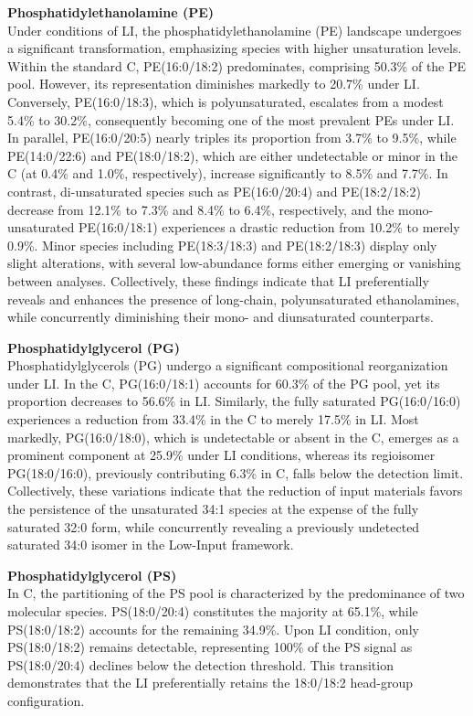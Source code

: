 \documentclass[10pt,letterpaper]{article}
\begin{document}
\textbf{Phosphatidylethanolamine (PE)}  \\
Under conditions of LI, the phosphatidylethanolamine (PE) landscape undergoes a significant transformation, emphasizing species with higher unsaturation levels. Within the standard C, PE(16:0/18:2) predominates, comprising 50.3\% of the PE pool. However, its representation diminishes markedly to 20.7\% under LI. Conversely, PE(16:0/18:3), which is polyunsaturated, escalates from a modest 5.4\% to 30.2\%, consequently becoming one of the most prevalent PEs under LI. In parallel, PE(16:0/20:5) nearly triples its proportion from 3.7\% to 9.5\%, while PE(14:0/22:6) and PE(18:0/18:2), which are either undetectable or minor in the C (at 0.4\% and 1.0\%, respectively), increase significantly to 8.5\% and 7.7\%. In contrast, di-unsaturated species such as PE(16:0/20:4) and PE(18:2/18:2) decrease from 12.1\% to 7.3\% and 8.4\% to 6.4\%, respectively, and the mono-unsaturated PE(16:0/18:1) experiences a drastic reduction from 10.2\% to merely 0.9\%. Minor species including PE(18:3/18:3) and PE(18:2/18:3) display only slight alterations, with several low-abundance forms either emerging or vanishing between analyses. Collectively, these findings indicate that LI preferentially reveals and enhances the presence of long-chain, polyunsaturated ethanolamines, while concurrently diminishing their mono- and diunsaturated counterparts.


\textbf{Phosphatidylglycerol (PG)}  \\
Phosphatidylglycerols (PG) undergo a significant compositional reorganization under LI. In the  C, PG(16:0/18:1) accounts for 60.3\% of the PG pool, yet its proportion decreases to 56.6\% in LI. Similarly, the fully saturated PG(16:0/16:0) experiences a reduction from 33.4\% in the C to merely 17.5\% in LI. Most markedly, PG(16:0/18:0), which is undetectable or absent in the C, emerges as a prominent component at 25.9\% under LI conditions, whereas its regioisomer PG(18:0/16:0), previously contributing 6.3\% in C, falls below the detection limit. Collectively, these variations indicate that the reduction of input materials favors the persistence of the unsaturated 34:1 species at the expense of the fully saturated 32:0 form, while concurrently revealing a previously undetected saturated 34:0 isomer in the Low-Input framework.

\textbf{Phosphatidylglycerol (PS)}  \\
In C, the partitioning of the PS pool is characterized by the predominance of two molecular species. PS(18:0/20:4) constitutes the majority at 65.1\%, while PS(18:0/18:2) accounts for the remaining 34.9\%. Upon LI condition, only PS(18:0/18:2) remains detectable, representing 100\% of the PS signal as PS(18:0/20:4) declines below the detection threshold. This transition demonstrates that the LI preferentially retains the 18:0/18:2 head-group configuration.
\end{document}
